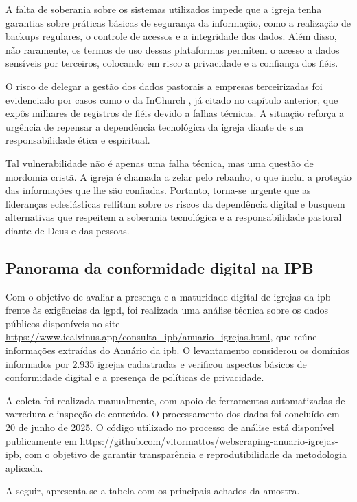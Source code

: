 A falta de soberania sobre os sistemas utilizados impede que a igreja tenha garantias sobre práticas básicas de segurança da informação, como a realização de backups regulares, o controle de acessos e a integridade dos dados. Além disso, não raramente, os termos de uso dessas plataformas permitem o acesso a dados sensíveis por terceiros, colocando em risco a privacidade e a confiança dos fiéis.

O risco de delegar a gestão dos dados pastorais a empresas terceirizadas foi evidenciado por casos como o da InChurch \cite{almeida_inchurch_2024}, já citado no capítulo anterior, que expôs milhares de registros de fiéis devido a falhas técnicas. A situação reforça a urgência de repensar a dependência tecnológica da igreja diante de sua responsabilidade ética e espiritual.

Tal vulnerabilidade não é apenas uma falha técnica, mas uma questão de mordomia cristã. A igreja é chamada a zelar pelo rebanho, o que inclui a proteção das informações que lhe são confiadas. Portanto, torna-se urgente que as lideranças eclesiásticas reflitam sobre os riscos da dependência digital e busquem alternativas que respeitem a soberania tecnológica e a responsabilidade pastoral diante de Deus e das pessoas.

\subsection{Panorama da conformidade digital na IPB}

Com o objetivo de avaliar a presença e a maturidade digital de igrejas da \gls{ipb} frente às exigências da \gls{lgpd}, foi realizada uma análise técnica sobre os dados públicos disponíveis no site \url{https://www.icalvinus.app/consulta_ipb/anuario_igrejas.html}, que reúne informações extraídas do Anuário da \gls{ipb}. O levantamento considerou os domínios informados por 2.935 igrejas cadastradas e verificou aspectos básicos de conformidade digital e a presença de políticas de privacidade.

A coleta foi realizada manualmente, com apoio de ferramentas automatizadas de varredura e inspeção de conteúdo. O processamento dos dados foi concluído em 20 de junho de 2025. O código utilizado no processo de análise está disponível publicamente em \url{https://github.com/vitormattos/webscraping-anuario-igrejas-ipb}, com o objetivo de garantir transparência e reprodutibilidade da metodologia aplicada.

A seguir, apresenta-se a tabela com os principais achados da amostra.

